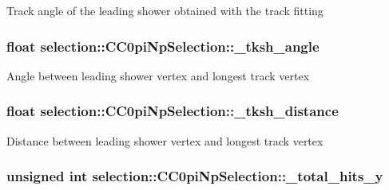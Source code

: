 Track angle of the leading shower obtained with the track fitting \hypertarget{classselection_1_1CC0piNpSelection_a959adc6093ff4d2730dac8f75dd1245c}{
\subsubsection[{\-\_\-tksh\-\_\-angle}]{\setlength{\rightskip}{0pt plus 5cm}float selection\-::\-C\-C0pi\-Np\-Selection\-::\-\_\-tksh\-\_\-angle\hspace{0.3cm}{\ttfamily [private]}}}\label{classselection_1_1CC0piNpSelection_a959adc6093ff4d2730dac8f75dd1245c}
Angle between leading shower vertex and longest track vertex \hypertarget{classselection_1_1CC0piNpSelection_a73d772bb569336b56a3f14cee752e2f3}{
\subsubsection[{\-\_\-tksh\-\_\-distance}]{\setlength{\rightskip}{0pt plus 5cm}float selection\-::\-C\-C0pi\-Np\-Selection\-::\-\_\-tksh\-\_\-distance\hspace{0.3cm}{\ttfamily [private]}}}\label{classselection_1_1CC0piNpSelection_a73d772bb569336b56a3f14cee752e2f3}
Distance between leading shower vertex and longest track vertex \hypertarget{classselection_1_1CC0piNpSelection_a819d1d973e74bcd2ad82aa01ea24ac37}{
\subsubsection[{\-\_\-total\-\_\-hits\-\_\-y}]{\setlength{\rightskip}{0pt plus 5cm}unsigned int selection\-::\-C\-C0pi\-Np\-Selection\-::\-\_\-total\-\_\-hits\-\_\-y\hspace{0.3cm}{\ttfamily [private]}}}\label{classselection_1_1CC0piNpSelection_a819d1d973e74bcd2ad82aa01ea24ac37}
